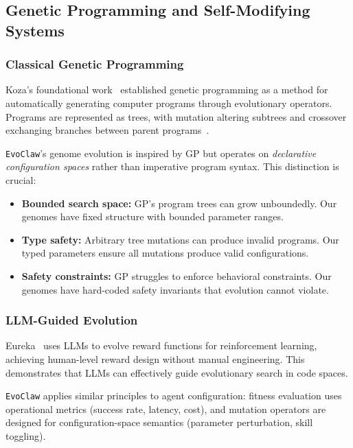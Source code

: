 \documentclass{article}
\newcommand{\evoclaw}{\texttt{EvoClaw}\xspace}
\begin{document}
\subsection{Genetic Programming and Self-Modifying Systems}

\subsubsection{Classical Genetic Programming}

Koza's foundational work~\cite{koza1992gp} established genetic programming as a method for automatically generating computer programs through evolutionary operators. Programs are represented as trees, with mutation altering subtrees and crossover exchanging branches between parent programs~\cite{angeline1994genetic}.

\evoclaw{}'s genome evolution is inspired by GP but operates on \textit{declarative configuration spaces} rather than imperative program syntax. This distinction is crucial:

\begin{itemize}[leftmargin=*]
    \item \textbf{Bounded search space:} GP's program trees can grow unboundedly. Our genomes have fixed structure with bounded parameter ranges.
    
    \item \textbf{Type safety:} Arbitrary tree mutations can produce invalid programs. Our typed parameters ensure all mutations produce valid configurations.
    
    \item \textbf{Safety constraints:} GP struggles to enforce behavioral constraints. Our genomes have hard-coded safety invariants that evolution cannot violate.
\end{itemize}

\subsubsection{LLM-Guided Evolution}

Eureka~\cite{ma2023eureka} uses LLMs to evolve reward functions for reinforcement learning, achieving human-level reward design without manual engineering. This demonstrates that LLMs can effectively guide evolutionary search in code spaces.

\evoclaw{} applies similar principles to agent configuration: fitness evaluation uses operational metrics (success rate, latency, cost), and mutation operators are designed for configuration-space semantics (parameter perturbation, skill toggling).
\end{document}
